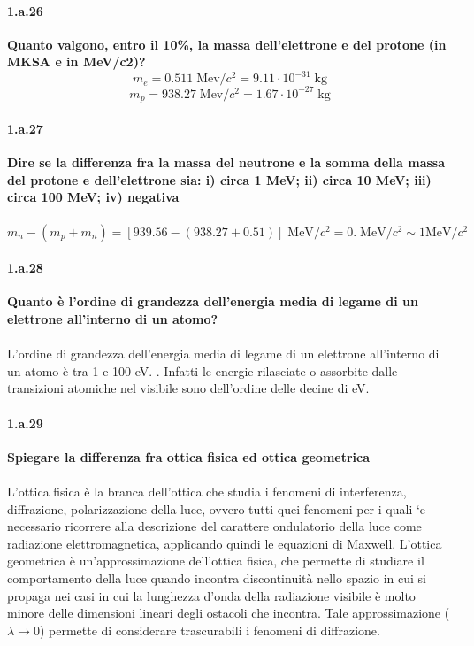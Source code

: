 \documentclass[twoside]{article}
\begin{document}
\paragraph{1.a.26}\textbf{Quanto valgono, entro il 10\%, la massa dell’elettrone e del protone (in MKSA e in MeV/c2)?}\\
\[
m_e=0.511 \;\text{Mev/$c^2$} = 9.11 \cdot 10^{-31} \; \text{kg}
\]
\[
m_p= 938.27 \;\text{Mev/$c^2$} = 1.67 \cdot 10^{-27} \; \text{kg}
\]

\paragraph{1.a.27}\textbf{Dire se la differenza fra la massa del neutrone e la somma della massa del protone e dell’elettrone sia: i) circa 1 MeV; ii) circa 10 MeV; iii) circa 100 MeV; iv) negativa}\\
\\
\[
m_n-(m_p+m_n)=[939.56-(938.27+0.51)] \; \text{MeV}/c^2=0. \; \text{MeV}/c^2 \sim 1 \text{MeV}/c^2
\]

\paragraph{1.a.28}\textbf{Quanto è l’ordine di grandezza dell’energia media di legame di un elettrone all’interno di un atomo?}\\
\\
L’ordine di grandezza dell'energia media di legame di un elettrone all'interno di un atomo è tra 1 e 100 eV. . Infatti le energie rilasciate o assorbite dalle transizioni atomiche nel visibile sono dell'ordine delle decine di eV.

\paragraph{1.a.29}\textbf{Spiegare la differenza fra ottica fisica ed ottica geometrica}\\
\\
L’ottica fisica è la branca dell'ottica che studia i fenomeni di interferenza, diffrazione, polarizzazione della luce, ovvero tutti quei fenomeni per i quali `e necessario ricorrere alla descrizione del carattere ondulatorio
della luce come radiazione elettromagnetica, applicando quindi le equazioni di Maxwell. L’ottica geometrica è un’approssimazione dell'ottica fisica, che permette di studiare il comportamento della luce quando incontra discontinuità nello spazio in cui si propaga nei casi in cui la lunghezza d’onda della
radiazione visibile è molto minore delle dimensioni lineari degli ostacoli che
incontra. Tale approssimazione ($\lambda \rightarrow 0$) permette di considerare trascurabili i fenomeni di diffrazione.
\end{document}
